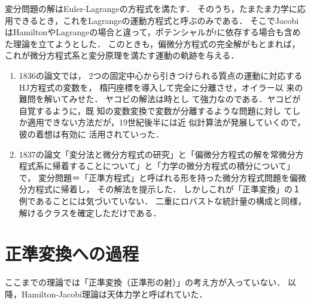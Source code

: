 \documentclass[uplatex, dvipdfmx]{jsreport}
\begin{document}
\begin{history}
    変分問題の解はEuler-Lagrangeの方程式を満たす．
    そのうち，たまたま力学に応用できるとき，これをLagrangeの運動方程式と呼ぶのみである．
    そこでJacobiはHamiltonやLagrangeの場合と違って，ポテンシャルが$t$に依存する場合も含めた理論を立てようとした．
    このときも，偏微分方程式の完全解がもとまれば，これが微分方程式系と変分原理を満たす運動の軌跡を与える．
\end{history}

\begin{history}[偏微分方程式の解法理論への貢献]\mbox{}
    \begin{enumerate}
        \item 1836の論文\cite{Jacobi36}では，
        2つの固定中心から引きつけられる質点の運動に対応するHJ方程式の変数を，
        楕円座標を導入して完全に分離させ，オイラー以
        来の難問を解いてみせた．
        ヤコビの解法は時とし
        て強力なのである．ヤコビが自覚するように，既
        知の変数変換で変数が分離するような問題に対し
        てしか適用できない方法だが，19世紀後半には近
        似計算法が発展していくので，彼の着想は有効に
        活用されていった．
        \item 1837の論文\cite{Jacobi37}「変分法と微分方程式の研究」と「偏微分方程式の解を常微分方程式系に帰着することについて」と「力学の微分方程式の積分について」で，
        変分問題＝「正準方程式」と呼ばれる形を持った微分方程式問題を偏微分方程式に帰着し，
        その解法を提示した．
        しかしこれが「正準変換」の１例であることには気づいていない．
        二重にロバストな統計量の構成と同様，解けるクラスを確定しただけである．
    \end{enumerate}
\end{history}

\section{正準変換への過程}

\begin{tcolorbox}[colframe=ForestGreen, colback=ForestGreen!10!white,breakable,colbacktitle=ForestGreen!40!white,coltitle=black,fonttitle=\bfseries\sffamily,
title=]
    ここまでの理論では「正準変換（正準形の射）」の考え方が入っていない．
    以降，Hamilton-Jacobi理論は天体力学と呼ばれていた．
\end{tcolorbox}
\end{document}
